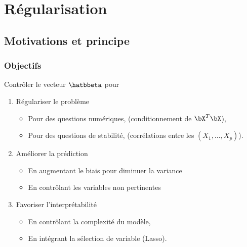 \documentclass{beamer}\usepackage[]{graphicx}\usepackage[]{color}
\begin{document}
\section{Régularisation}


\subsection{Motivations et principe}

\begin{frame}
  \frametitle{Objectifs}

  Contrôler le vecteur $\hatbbeta$ pour

  \begin{enumerate}
  \item \alert{Régulariser} le problème
    \begin{itemize}
    \item Pour des questions numériques, (conditionnement de $\bX^T\bX$),
    \item Pour des questions de stabilité, (corrélations entre les $(X_1,\dots,X_p)$).
    \end{itemize}
    \bigskip
  \item \alert{Améliorer} la prédiction
    \begin{itemize}
    \item En augmentant le biais pour diminuer la variance
    \item En contrôlant les variables non pertinentes
    \end{itemize}
    \bigskip
  \item \alert{Favoriser} l'interprétabilité
    \begin{itemize}
    \item En contrôlant la complexité du modèle,
    \item En intégrant la sélection de variable (Lasso).
    \end{itemize}
  \end{enumerate}

\end{frame}


\end{document}
